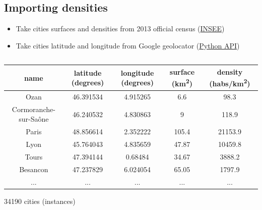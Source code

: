 \documentclass[c]{beamer}
\begin{document}
\subsection{Importing densities}
\begin{frame}
 \begin{itemize}
  \item Take cities surfaces and densities from 2013 official census (\href{http://www.insee.fr/fr/ppp/bases-de-donnees/recensement/populations-legales/pages2015/zip/HIST_POP_COM_RP13.zip}{INSEE})
  \item Take cities latitude and longitude from Google geolocator (\href{https://geopy.readthedocs.io/en/1.10.0/}{Python API})
 \end{itemize}

\begin{columns}
\begin{column}{0.80\textwidth}
\begin{overlayarea}{\linewidth}{3cm}
\begin{table}
\begin{center}
\begin{adjustbox}{max width=\textwidth}
{\LARGE
\begin{tabular}{|c|c|c|c|c|}
\hline 
name & latitude (degrees) & longitude (degrees) & surface (km\textsuperscript{2}) & density (habs/km\textsuperscript{2}) \\
\hline
Ozan & 46.391534 & 4.915265 & 6.6 & 98.3\\
\hline 
Cormoranche-sur-Sa\^{o}ne & 46.240532 & 4.830863 & 9 & 118.9\\
\hline 
Paris & 48.856614 & 2.352222 & 105.4 & 21153.9\\
\hline
Lyon & 45.764043 & 4.835659 & 47.87 & 10459.8\\
\hline
Tours & 47.394144 & 0.68484 & 34.67 & 3888.2\\
\hline
Besancon & 47.237829 & 6.024054 & 65.05 & 1797.9\\
\hline 
... & ... & ... & ... & ... \\
\hline
\end{tabular}
}
\end{adjustbox}
\end{center}
\end{table}
\end{overlayarea}
\begin{overlayarea}{\linewidth}{1cm}
  \centering
  \scriptsize34190 cities (instances)\par
\end{overlayarea}
\end{column}
\end{columns}

\end{frame}
\end{document}
